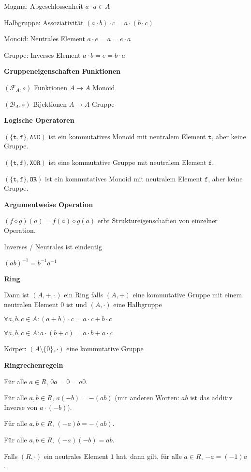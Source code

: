 \documentclass[a4paper,10pt]{article}
\begin{document}
\begin{multicols}{3}
Magma: Abgeschlossenheit $a \cdot a \in A$

Halbgruppe: Assoziativität $(a \cdot b) \cdot c = a \cdot (b \cdot c)$

Monoid: Neutrales Element $a \cdot e = a = e \cdot a$

Gruppe: Inverses Element $a \cdot b = e = b \cdot a$

\textbf{Gruppeneigenschaften Funktionen}

$(\mathcal{F}_A,\circ)$ Funktionen $A\to A$ Monoid

$(\mathcal{B}_A,\circ)$ Bijektionen $A\to A$ Gruppe

\textbf{Logische Operatoren}

$(\{\mathtt{t},\mathtt{f}\},\mathtt{AND})$ ist ein kommutatives Monoid mit neutralem Element $\mathtt{t}$, aber keine Gruppe.

$(\{\mathtt{t},\mathtt{f}\},\mathtt{XOR})$ ist eine kommutative Gruppe mit neutralem Element $\mathtt{f}$.

$(\{\mathtt{t},\mathtt{f}\},\mathtt{OR})$ ist ein kommutatives Monoid mit neutralem Element $\mathtt{f}$, aber keine Gruppe.

\textbf{Argumentweise Operation}

$(f \diamond g) (a) = f(a) \diamond g(a)$ erbt Struktureigenschaften von einzelner Operation.

Inverses / Neutrales ist eindeutig

$(ab)^{-1} = b^{-1} a^{-1}$

\textbf{Ring}

Dann ist $(A,+,\cdot)$ ein Ring falls $(A,+)$ eine kommutative Gruppe mit einem neutralen Element $0$ ist und $(A, \cdot)$ eine Halbgruppe

$\forall a,b,c \in A: (a+b)\cdot c = a\cdot c + b \cdot c$

$\forall a,b,c \in A: a\cdot(b+c) = a\cdot b + a \cdot c$

Körper: $(A \setminus \{0\},\cdot)$ eine kommutative Gruppe

\textbf{Ringrechenregeln}

Für alle $a \in R$, $0a = 0 = a0$.

Für alle $a,b \in R$, $a(-b) = -(ab)$ (mit anderen Worten: $ab$ ist das additiv Inverse von $a \cdot (-b)$).

Für alle $a,b \in R$, $(-a)b = -(ab)$.

Für alle $a,b \in R$, $(-a)(-b) = ab$.

Falls $(R,\cdot)$ ein neutrales Element $1$ hat, dann gilt, für alle $a \in R$, $-a = (-1)a$.


\end{multicols}
\end{document}
